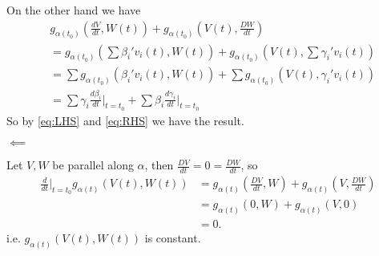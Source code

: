 \documentclass{article}
\begin{document}
On the other hand we have
\begin{align}
  \label{eq:RHS}
  &g_{\alpha(t_0)}\left(\frac{dV}{dt},W(t)\right) + g_{\alpha(t_0)}\left(V(t),\frac{DW}{dt}\right) \nonumber\\
  &= g_{\alpha(t_0)}\left(\sum\beta_i'v_i(t),W(t)\right) + g_{\alpha(t_0)}\left(V(t),\sum\gamma_i'v_i(t)\right)\nonumber\\
  &= \sum g_{\alpha(t_0)}\left(\beta_i'v_i(t),W(t)\right) + \sum g_{\alpha(t_0)}\left(V(t),\gamma_i'v_i(t)\right)\nonumber\\
  &= \sum\gamma_i\frac{d\beta_i}{dt}\bigg|_{t=t_0} + \sum\beta_i\frac{d\gamma_i}{dt}\bigg|_{t=t_0}
\end{align}
So by \eqref{eq:LHS} and \eqref{eq:RHS} we have the result.

\(\impliedby\)

Let \(V,W\) be parallel along \(\alpha\), then \(\frac{DV}{dt}=0=\frac{DW}{dt}\), so
\begin{align*}
  \frac{d}{dt}\bigg|_{t=t_0}g_{\alpha(t)}(V(t),W(t))&=g_{\alpha(t)}\left(\frac{DV}{dt},W\right)+g_{\alpha(t)}\left(V,\frac{DW}{dt}\right)\\
  &=g_{\alpha(t)}\left(0,W\right)+g_{\alpha(t)}\left(V,0\right)\\
  &=0.
\end{align*}
i.e. \(g_{\alpha(t)}(V(t),W(t))\) is constant.
\end{document}
